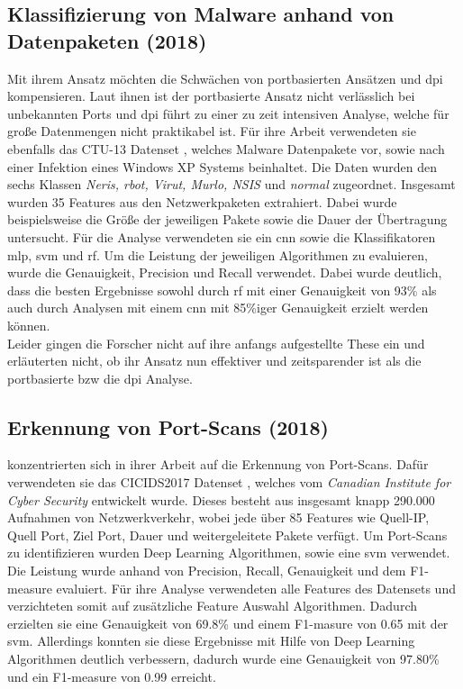 \documentclass[
    12pt, %
    DIV10,
    ngerman, %
    a4paper, %
    oneside, %
    titlepage, %
    parskip=half, %
    headings=normal, %
    listof=totoc, %
    bibliography=totoc, %
    index=totoc, %
    captions=tableheading, %
    final %
]{scrreprt}
\begin{document}
\subsection{Klassifizierung von Malware anhand von Datenpaketen (2018)}
Mit ihrem Ansatz möchten \textcite{Yeo2018} die Schwächen von portbasierten Ansätzen und \ac{dpi} kompensieren. Laut ihnen ist der portbasierte Ansatz nicht verlässlich bei unbekannten Ports und \ac{dpi} \parencite{dharmapurikar2003deep} führt zu einer zu zeit intensiven Analyse, welche für große Datenmengen nicht praktikabel ist. Für ihre Arbeit verwendeten sie ebenfalls das CTU-13 Datenset \parencite{garcia2014empirical}, welches Malware Datenpakete vor, sowie nach einer Infektion eines Windows XP Systems beinhaltet. Die Daten wurden den sechs Klassen \emph{Neris, rbot, Virut, Murlo, NSIS} und \emph{normal} zugeordnet. Insgesamt wurden 35 Features aus den Netzwerkpaketen extrahiert. Dabei wurde beispielsweise die Größe der jeweiligen Pakete sowie die Dauer der Übertragung untersucht. Für die Analyse verwendeten sie ein \ac{cnn} sowie die Klassifikatoren \ac{mlp}, \ac{svm} und \ac{rf}. Um die Leistung der jeweiligen Algorithmen zu evaluieren, wurde die Genauigkeit, Precision und Recall verwendet. Dabei wurde deutlich, dass die besten Ergebnisse sowohl durch \ac{rf} mit einer Genauigkeit von 93\% als auch durch Analysen mit einem \ac{cnn} mit 85\%iger Genauigkeit erzielt werden können. \\
Leider gingen die Forscher nicht auf ihre anfangs aufgestellte These ein und erläuterten nicht, ob ihr Ansatz nun effektiver und zeitsparender ist als die portbasierte bzw die \ac{dpi} Analyse.
%
\subsection{Erkennung von Port-Scans (2018)}
\textcite{Aksu2019} konzentrierten sich in ihrer Arbeit auf die Erkennung von Port-Scans. Dafür verwendeten sie das CICIDS2017 Datenset \parencite{Sharafaldin2018}, welches vom \emph{Canadian Institute for Cyber Security} entwickelt wurde. Dieses besteht aus insgesamt knapp 290.000 Aufnahmen von Netzwerkverkehr, wobei jede über 85 Features wie Quell-IP, Quell Port, Ziel Port, Dauer und weitergeleitete Pakete verfügt. Um Port-Scans zu identifizieren wurden Deep Learning Algorithmen, sowie eine \ac{svm} verwendet. Die Leistung wurde anhand von Precision, Recall, Genauigkeit und dem F1-measure evaluiert. Für ihre Analyse verwendeten  \textcite{Aksu2019} alle Features des Datensets und verzichteten somit auf zusätzliche Feature Auswahl Algorithmen. Dadurch erzielten sie eine Genauigkeit von 69.8\% und einem F1-masure von 0.65 mit der \ac{svm}. Allerdings  konnten sie diese Ergebnisse mit Hilfe von Deep Learning Algorithmen deutlich verbessern, dadurch wurde eine Genauigkeit von 97.80\% und ein F1-measure von 0.99 erreicht.
%
\end{document}
